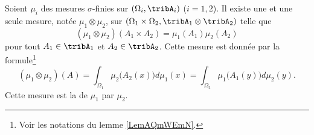 \begin{theorem}   \label{ThoWWAjXzi}
    Soient \( \mu_i\) des mesures $\sigma$-finies sur \( (\Omega_i,\tribA_i)\) (\( i=1,2\)). Il existe une et une seule mesure, notée \( \mu_1\otimes \mu_2\), sur \( (\Omega_1\times\Omega_2,\tribA_1\otimes\tribA_2)\) telle que
    \begin{equation}    \label{EqOIuWLQU}
        (\mu_1\otimes\mu_2)(A_1\times A_2)=\mu_1(A_1)\mu_2(A_2)
    \end{equation}
    pour tout \( A_1\in \tribA_1\) et \( A_2\in\tribA_2\). Cette mesure est donnée par la formule\footnote{Voir les notations du lemme \ref{LemAQmWEmN}.}
    \begin{equation}   \label{EqDFxuGtH}
        (\mu_1\otimes \mu_2)(A)=\int_{\Omega_1}\mu_2\big( A_2(x) \big)d\mu_1(x)=\int_{\Omega_2}\mu_1\big( A_1(y) \big)d\mu_2(y).
    \end{equation}
    Cette mesure est la  de \( \mu_1\) par \( \mu_2\).
\end{theorem}


